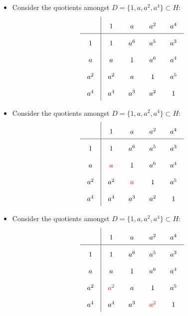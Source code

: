 \documentclass{beamer}
\newcommand{\RR}[1]{\textcolor{red}{#1}}
\begin{document}
\begin{frame}

  \begin{itemize}
  \item Consider the quotients amongst $D=\{1,a,a^2,a^4\} \subset H$:
    \[
      \arraycolsep=10.0pt\def\arraystretch{2.0}
      \begin{array}{c|cccc}
        \text{ } & 1 & a & a^2 & a^4 \\ \hline
        1 & 1 & a^6 & a^5 & a^3 \\
        a & a & 1 & a^6 & a^4 \\
        a^2 & a^2 & a & 1 & a^5 \\
        a^4 & a^4 & a^3 & a^2 & 1
      \end{array}
    \]
  \end{itemize}

\end{frame}

\begin{frame}

  \begin{itemize}
  \item Consider the quotients amongst $D=\{1,a,a^2,a^4\} \subset H$:
    \[
      \arraycolsep=10.0pt\def\arraystretch{2.0}
      \begin{array}{c|cccc}
        \text{ } & 1 & a & a^2 & a^4 \\ \hline
        1 & 1 & a^6 & a^5 & a^3 \\
        a & \RR{ a } & 1 & a^6 & a^4 \\
        a^2 & a^2 & \RR{ a } & 1 & a^5 \\
        a^4 & a^4 & a^3 & a^2 & 1
      \end{array}
    \]
  \end{itemize}

\end{frame}

\begin{frame}

  \begin{itemize}
  \item Consider the quotients amongst $D=\{1,a,a^2,a^4\} \subset H$:
    \[
      \arraycolsep=10.0pt\def\arraystretch{2.0}
      \begin{array}{c|cccc}
        \text{ } & 1 & a & a^2 & a^4 \\ \hline
        1 & 1 & a^6 & a^5 & a^3 \\
        a & a & 1 & a^6 & a^4 \\
        a^2 & \RR{ a^2 } & a & 1 & a^5 \\
        a^4 & a^4 & a^3 & \RR{ a^2 } & 1
      \end{array}
    \]
  \end{itemize}

\end{frame}
\end{document}
